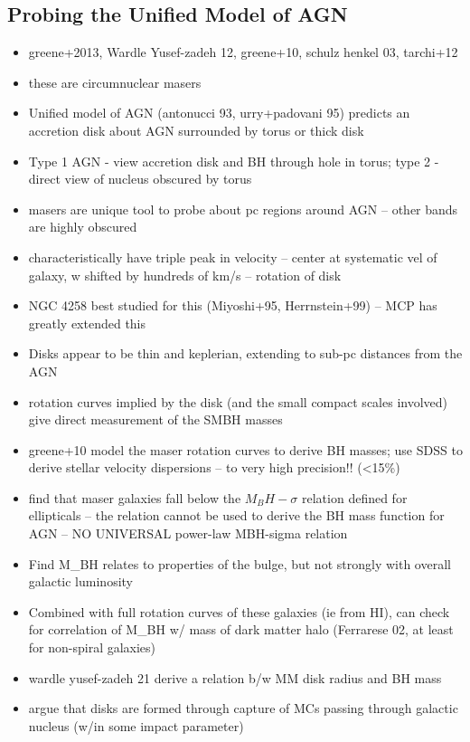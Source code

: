 \subsection{Probing the Unified Model of AGN}
\label{sub:h20_agn}

\begin{itemize}
\item greene+2013, Wardle Yusef-zadeh 12, greene+10, schulz henkel 03, tarchi+12
\item these are circumnuclear masers
\item Unified model of AGN (antonucci 93, urry+padovani 95) predicts an accretion disk about AGN surrounded by torus or thick disk
\item Type 1 AGN - view accretion disk and BH through hole in torus; type 2 - direct view of nucleus obscured by torus
\item masers are unique tool to probe about pc regions around AGN -- other bands are highly obscured
\item characteristically have triple peak in velocity -- center at systematic vel of galaxy, w shifted by hundreds of km/s -- rotation of disk
\item NGC 4258 best studied for this  (Miyoshi+95, Herrnstein+99) -- MCP has greatly extended this
\item Disks appear to be thin and keplerian, extending to sub-pc distances from the AGN
\item rotation curves implied by the disk (and the small compact scales involved) give direct measurement of the SMBH masses
\item greene+10 model the maser rotation curves to derive BH masses; use SDSS to derive stellar velocity dispersions -- to very high precision!! (<15\%)
\item find that maser galaxies fall below the $M_BH-\sigma$ relation defined for ellipticals -- the relation cannot be used to derive the BH mass function for AGN -- NO UNIVERSAL power-law MBH-sigma relation
\item Find M_BH relates to properties of the bulge, but not strongly with overall galactic luminosity
\item Combined with full rotation curves of these galaxies (ie from HI), can check for correlation of M_BH w/ mass of dark matter halo (Ferrarese 02, at least for non-spiral galaxies)
\item wardle yusef-zadeh 21 derive a relation b/w MM disk radius and BH mass
\item argue that disks are formed through capture of MCs passing through galactic nucleus (w/in some impact parameter)

\end{itemize}
